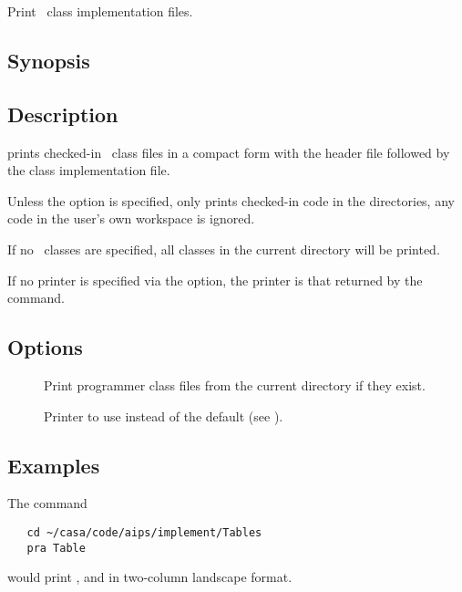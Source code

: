Print \aipspp\ class implementation files.

\subsection*{Synopsis}

\begin{synopsis}
\end{synopsis}

\subsection*{Description}

 prints checked-in \aipspp\ class files in a compact form with the
header file followed by the class implementation file.

Unless the  option is specified,  only prints checked-in code
in the  directories, any code in the user's own workspace is
ignored.

If no \aipspp\ classes are specified, all classes in the current directory
will be printed.

If no printer is specified via the  option, the printer is that
returned by the  command.

\subsection*{Options}

\begin{description}
\item[]
   Print programmer class files from the current directory if they exist.

\item[]
   Printer to use instead of the default (see ).
\end{description}

\subsection*{Examples}

The command

\begin{verbatim}
   cd ~/casa/code/aips/implement/Tables
   pra Table
\end{verbatim}

\noindent
would print , and  in two-column landscape
format.

